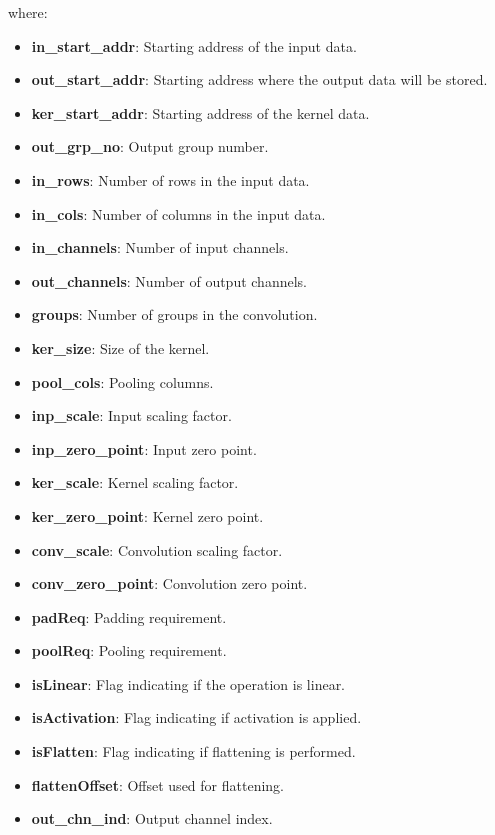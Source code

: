 where:
\begin{itemize}
    \item \textbf{in\_start\_addr}: Starting address of the input data.
    \item \textbf{out\_start\_addr}: Starting address where the output data will be stored.
    \item \textbf{ker\_start\_addr}: Starting address of the kernel data.
    \item \textbf{out\_grp\_no}: Output group number.
    \item \textbf{in\_rows}: Number of rows in the input data.
    \item \textbf{in\_cols}: Number of columns in the input data.
    \item \textbf{in\_channels}: Number of input channels.
    \item \textbf{out\_channels}: Number of output channels.
    \item \textbf{groups}: Number of groups in the convolution.
    \item \textbf{ker\_size}: Size of the kernel.
    \item \textbf{pool\_cols}: Pooling columns.
    \item \textbf{inp\_scale}: Input scaling factor.
    \item \textbf{inp\_zero\_point}: Input zero point.
    \item \textbf{ker\_scale}: Kernel scaling factor.
    \item \textbf{ker\_zero\_point}: Kernel zero point.
    \item \textbf{conv\_scale}: Convolution scaling factor.
    \item \textbf{conv\_zero\_point}: Convolution zero point.
    \item \textbf{padReq}: Padding requirement.
    \item \textbf{poolReq}: Pooling requirement.
    \item \textbf{isLinear}: Flag indicating if the operation is linear.
    \item \textbf{isActivation}: Flag indicating if activation is applied.
    \item \textbf{isFlatten}: Flag indicating if flattening is performed.
    \item \textbf{flattenOffset}: Offset used for flattening.
    \item \textbf{out\_chn\_ind}: Output channel index.
\end{itemize}

